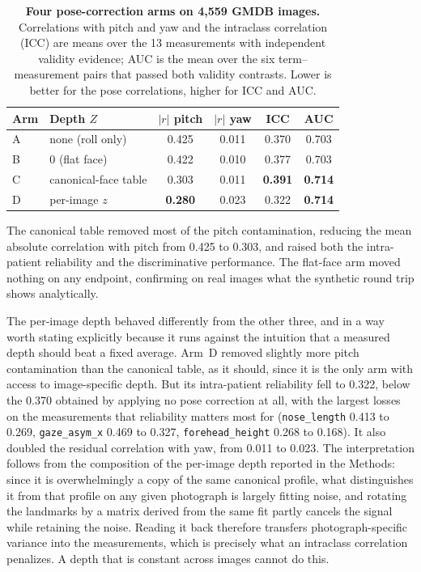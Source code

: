 \documentclass[11pt]{article}
\begin{document}
\begin{table}[t]
  \centering
  \caption{\textbf{Four pose-correction arms on 4,559 GMDB images.}
  Correlations with pitch and yaw and the intraclass correlation (ICC) are means
  over the 13 measurements with independent validity evidence; AUC is the mean
  over the six term--measurement pairs that passed both validity contrasts.
  Lower is better for the pose correlations, higher for ICC and AUC.}
  \label{tab:posearms}
  \begin{tabular}{llccc c}
    \toprule
    Arm & Depth $Z$ & $|r|$ pitch & $|r|$ yaw & ICC & AUC \\
    \midrule
    A & none (roll only)      & 0.425 & 0.011 & 0.370 & 0.703 \\
    B & $0$ (flat face)       & 0.422 & 0.010 & 0.377 & 0.703 \\
    C & canonical-face table  & 0.303 & 0.011 & \textbf{0.391} & \textbf{0.714} \\
    D & per-image $z$         & \textbf{0.280} & 0.023 & 0.322 & \textbf{0.714} \\
    \bottomrule
  \end{tabular}
\end{table}

The canonical table removed most of the pitch contamination, reducing the mean
absolute correlation with pitch from 0.425 to 0.303, and raised both the
intra-patient reliability and the discriminative performance. The flat-face arm
moved nothing on any endpoint, confirming on real images what the synthetic round
trip shows analytically.

The per-image depth behaved differently from the other three, and in a way worth
stating explicitly because it runs against the intuition that a measured depth
should beat a fixed average. Arm~D removed slightly more pitch contamination than
the canonical table, as it should, since it is the only arm with access to
image-specific depth. But its intra-patient reliability fell to 0.322, below the
0.370 obtained by applying no pose correction at all, with the largest losses on
the measurements that reliability matters most for
(\texttt{nose\_length} 0.413 to 0.269, \texttt{gaze\_asym\_x} 0.469 to 0.327,
\texttt{forehead\_height} 0.268 to 0.168). It also doubled the residual
correlation with yaw, from 0.011 to 0.023. The interpretation follows from the
composition of the per-image depth reported in the Methods: since it is
overwhelmingly a copy of the same canonical profile, what distinguishes it from
that profile on any given photograph is largely fitting noise, and rotating the
landmarks by a matrix derived from the same fit partly cancels the signal while
retaining the noise. Reading it back therefore transfers photograph-specific
variance into the measurements, which is precisely what an intraclass correlation
penalizes. A depth that is constant across images cannot do this.
\end{document}
